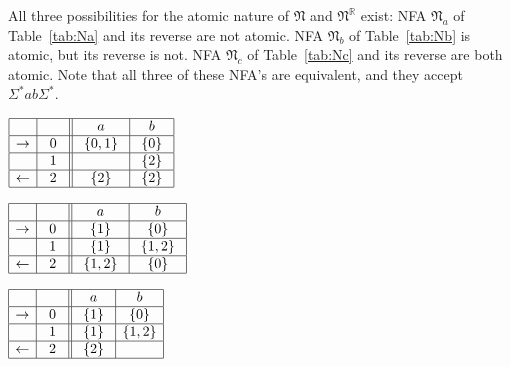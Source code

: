 \documentclass{llncs}
\newcommand{\Sig}{\Sigma}
\newcommand{\fN}{{\mathfrak N}}
\newcommand{\rev}{\mathbb{R}}
\begin{document}
All three possibilities for the atomic nature of $\fN$ and $\fN^\rev$ exist:
NFA $\fN_{a}$ of Table~\ref{tab:Na} and its reverse are not atomic.
NFA $\fN_{b}$ of Table~\ref{tab:Nb} is atomic, but its reverse is not.
NFA $\fN_{c}$ of Table~\ref{tab:Nc} and its reverse are both atomic.
Note that all three of these NFA's are equivalent, and they accept $\Sig^*ab\Sig^*$.
\begin{table}[t]
\begin{minipage}[b]{0.3\linewidth}
\caption{$\fN_a$.}
\label{tab:Na}
\begin{center}
$
\begin{array}{|c| c||c| c| }    
\hline
& \ \  \ \ 
&\ \ a \ \ &\ \ b \ \   \\
\hline  
\rightarrow & 0
& \ \{0,1\} \ & \ \{0\} \   \\
\hline  
& 1
&  & \{2\}    \\
\hline  
\leftarrow& 2
&  \{2\} &  \{2\}   \\
\hline  
\end{array}
$
\end{center}
\end{minipage}
\hspace{0.3cm}
\begin{minipage}[b]{0.3\linewidth}
\caption{$\fN_b$.}
\label{tab:Nb}
\begin{center}
$
\begin{array}{|c| c||c| c| }    
\hline
& \ \  \ \ 
&\ \ a \ \ &\ \ b \ \ \\
\hline  
\rightarrow & 0
& \ \{1\} \ & \ \{0\} \ \\
\hline  
 & 1
&  \{1 \} & \  \{1,2 \} \ \\
\hline  
\leftarrow & \ 2 \
 & \ \{1,2\} \ & \ \{ 0\} \ \\
\hline  
\end{array}
$
\end{center}
\end{minipage}
\hspace{0.3cm}
\begin{minipage}[b]{0.3\linewidth}
\caption{$\fN_c$.}
\label{tab:Nc}
\begin{center}
$
\begin{array}{|c| c||c| c| }    
\hline
& \ \  \ \ 
&\ \ a \ \ &\ \ b \ \ \\
\hline  
\rightarrow & 0
& \ \{1\} \ & \ \{0\} \ \\
\hline  
 & 1
&  \{1\} & \{1,2\} \\
\hline  
\leftarrow & \ 2 \
 & \ \{2\} \ & \  \ \\
\hline  
\end{array}
$
\end{center}
\end{minipage}

\end{table}
\end{document}
